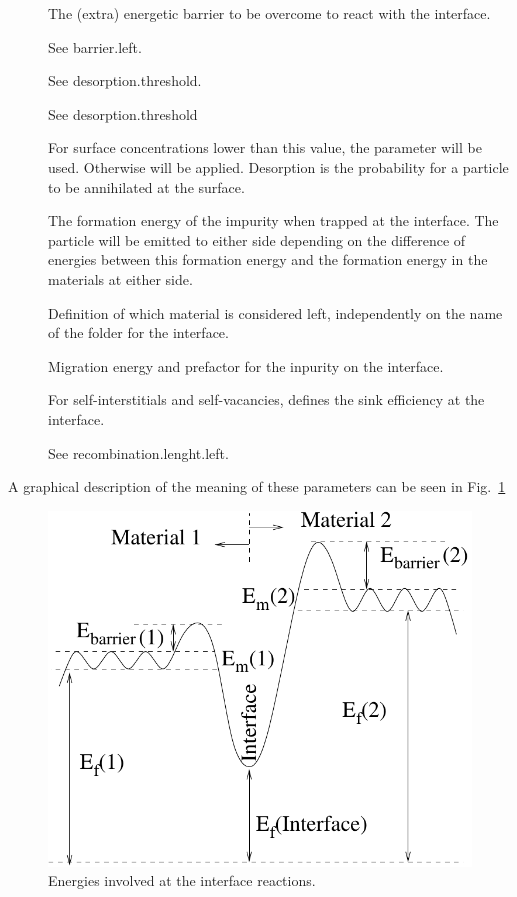 \begin{description}
\item[] The (extra) energetic barrier to be overcome to react with the interface.
\item[] See barrier.left.
\item[] See desorption.threshold.
\item[] See desorption.threshold
\item[] For surface concentrations lower than this value, the parameter  will be used. Otherwise  will be applied. Desorption is the probability for a particle to be annihilated at the surface.
\item[] The formation energy of the impurity when trapped at the interface. The particle will be emitted to either side depending on the difference of energies between this formation energy and the formation energy in the materials at either side.
\item[] Definition of which material is considered left, independently on the name of the folder for the interface.
\item[] Migration energy and prefactor for the inpurity on the interface.
\item[] For self-interstitials and self-vacancies, defines the sink efficiency at the interface.
\item[] See recombination.lenght.left.
\end{description}

A graphical description of the meaning of these parameters can be seen in Fig.~\ref{fig:interface}

\begin{figure}
\includegraphics{images/interface}
\caption{Energies involved at the interface reactions.}
\label{fig:interface}
\end{figure}


